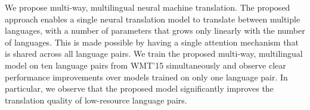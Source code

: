 We propose multi-way, multilingual neural machine translation. The proposed approach enables a single neural translation model to translate between multiple languages, with a number of parameters that grows only linearly with the number of languages. This is made possible by having a single attention mechanism that is shared across all language pairs. We train the proposed multi-way, multilingual model on ten language pairs from WMT'15 simultaneously and observe clear performance improvements over models trained on only one language pair. In particular, we observe that the proposed model significantly improves the translation quality of low-resource language pairs.
